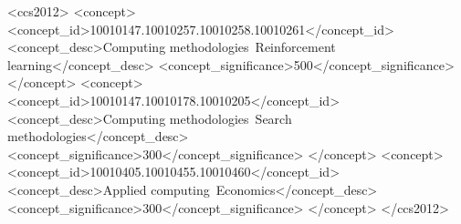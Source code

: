 \begin{CCSXML}
<ccs2012>
   <concept>
       <concept_id>10010147.10010257.10010258.10010261</concept_id>
       <concept_desc>Computing methodologies~Reinforcement learning</concept_desc>
       <concept_significance>500</concept_significance>
       </concept>
   <concept>
       <concept_id>10010147.10010178.10010205</concept_id>
       <concept_desc>Computing methodologies~Search methodologies</concept_desc>
       <concept_significance>300</concept_significance>
       </concept>
   <concept>
       <concept_id>10010405.10010455.10010460</concept_id>
       <concept_desc>Applied computing~Economics</concept_desc>
       <concept_significance>300</concept_significance>
       </concept>
 </ccs2012>
\end{CCSXML}



